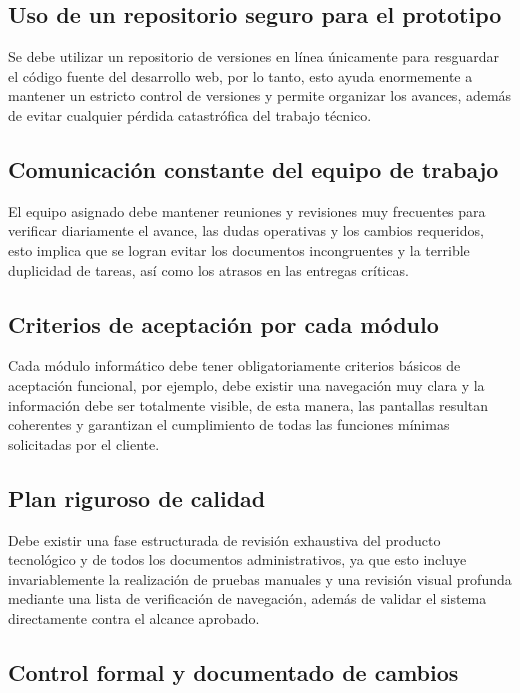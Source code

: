 \documentclass[11pt,spanish]{article}
\begin{document}
\subsection{Uso de un repositorio seguro para el prototipo}

Se debe utilizar un repositorio de versiones en línea únicamente para resguardar el código fuente del desarrollo web, por lo tanto, esto ayuda enormemente a mantener un estricto control de versiones y permite organizar los avances, además de evitar cualquier pérdida catastrófica del trabajo técnico.

\subsection{Comunicación constante del equipo de trabajo}

El equipo asignado debe mantener reuniones y revisiones muy frecuentes para verificar diariamente el avance, las dudas operativas y los cambios requeridos, esto implica que se logran evitar los documentos incongruentes y la terrible duplicidad de tareas, así como los atrasos en las entregas críticas.

\subsection{Criterios de aceptación por cada módulo}

Cada módulo informático debe tener obligatoriamente criterios básicos de aceptación funcional, por ejemplo, debe existir una navegación muy clara y la información debe ser totalmente visible, de esta manera, las pantallas resultan coherentes y garantizan el cumplimiento de todas las funciones mínimas solicitadas por el cliente.

\subsection{Plan riguroso de calidad}

Debe existir una fase estructurada de revisión exhaustiva del producto tecnológico y de todos los documentos administrativos, ya que esto incluye invariablemente la realización de pruebas manuales y una revisión visual profunda mediante una lista de verificación de navegación, además de validar el sistema directamente contra el alcance aprobado.

\subsection{Control formal y documentado de cambios}
\end{document}
